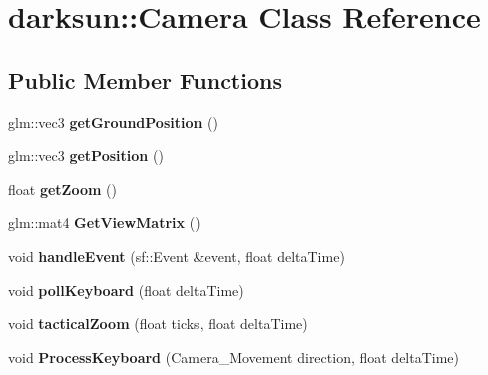 \hypertarget{classdarksun_1_1_camera}{}\section{darksun\+::Camera Class Reference}
\label{classdarksun_1_1_camera}
\subsection*{Public Member Functions}
\begin{DoxyCompactItemize}
\item 
\mbox{\label{classdarksun_1_1_camera_a2657af0d25a0ca00cc4c33a6e938df93}} 
glm\+::vec3 {\bfseries get\+Ground\+Position} ()
\item 
\mbox{\label{classdarksun_1_1_camera_ad3d16ab5dfd76ea222edc1c5ec2f8ea7}} 
glm\+::vec3 {\bfseries get\+Position} ()
\item 
\mbox{\label{classdarksun_1_1_camera_a6c23fa9c3a5283e381c504cefeadfc33}} 
float {\bfseries get\+Zoom} ()
\item 
\mbox{\label{classdarksun_1_1_camera_a40b31b62f9046cd40c0250f297077293}} 
glm\+::mat4 {\bfseries Get\+View\+Matrix} ()
\item 
\mbox{\label{classdarksun_1_1_camera_a863cb9d5bf8089c7c2439dc10558c487}} 
void {\bfseries handle\+Event} (sf\+::\+Event \&event, float delta\+Time)
\item 
\mbox{\label{classdarksun_1_1_camera_a01e09826bcdad741a2667656b606bbd2}} 
void {\bfseries poll\+Keyboard} (float delta\+Time)
\item 
\mbox{\label{classdarksun_1_1_camera_ad66ccb1bd434d5824693261e9dfb1ced}} 
void {\bfseries tactical\+Zoom} (float ticks, float delta\+Time)
\item 
\mbox{\label{classdarksun_1_1_camera_a46661a8f5885820d92d37f5f62c1fd35}} 
void {\bfseries Process\+Keyboard} (Camera\+\_\+\+Movement direction, float delta\+Time)
\item 

\end{DoxyCompactItemize}
